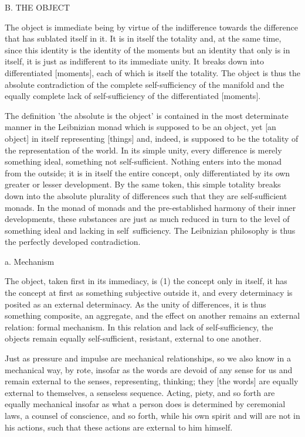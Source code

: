 B. THE OBJECT

The object is immediate being by virtue of
the indifference towards the difference
that has sublated itself in it.
It is in itself the totality
and, at the same time,
since this identity is the identity of the moments
but an identity that only is in itself,
it is just as indifferent to its immediate unity.
It breaks down into differentiated [moments],
each of which is itself the totality.
The object is thus the absolute contradiction of
the complete self-sufficiency of the manifold
and the equally complete lack of self-sufficiency
of the differentiated [moments].

The definition 'the absolute is the object'
is contained in the most determinate manner
in the Leibnizian monad which is supposed to be an object,
yet [an object] in itself representing [things]
and, indeed, is supposed to be the totality of
the representation of the world.
In its simple unity,
every difference is merely something ideal,
something not self-sufficient.
Nothing enters into the monad from the outside;
it is in itself the entire concept,
only differentiated by its own
greater or lesser development.
By the same token, this simple totality breaks down
into the absolute plurality of differences such
that they are self-sufficient monads.
In the monad of monads and the pre-established harmony
of their inner developments,
these substances are just as much reduced in turn
to the level of something ideal
and lacking in self~sufficiency.
The Leibnizian philosophy is thus
the perfectly developed contradiction.

a. Mechanism

The object, taken first in its immediacy, is
(1) the concept only in itself,
it has the concept at first
as something subjective outside it,
and every determinacy is posited
as an external determinacy.
As the unity of differences,
it is thus something composite, an aggregate,
and the effect on another remains
an external relation: formal mechanism.
In this relation and lack of self-sufficiency,
the objects remain equally self-sufficient,
resistant, external to one another.

Just as pressure and impulse are mechanical relationships,
so we also know in a mechanical way, by rote,
insofar as the words are devoid of any sense for us
and remain external to the senses, representing, thinking;
they [the words] are equally external to themselves,
a senseless sequence.
Acting, piety, and so forth are equally mechanical
insofar as what a person does is determined by
ceremonial laws, a counsel of conscience, and so forth,
while his own spirit and will are not in his actions,
such that these actions are external to him himself.

